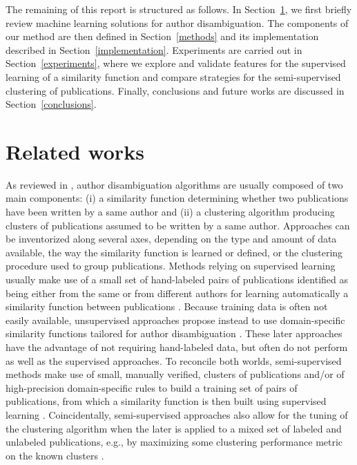 \documentclass{article}
\begin{document}
The remaining of this report is structured as follows. In Section~\ref{related-works},
we first briefly review machine learning solutions for author disambiguation.
The components of our method are then defined in Section~\ref{methods}
and its implementation described in Section~\ref{implementation}. Experiments
are carried out in Section~\ref{experiments}, where we explore and validate
features for the supervised learning of a similarity function and compare
strategies for the semi-supervised clustering of publications.
Finally, conclusions and future works are discussed in Section~\ref{conclusions}.



\section{Related works}
\label{related-works}

As reviewed in
\citep{smalheiser2009author,ferreira2012brief,levin2012citation}, author
disambiguation algorithms are usually composed of two main components: (i) a
similarity function determining whether two publications have been written by a
same author and (ii) a clustering algorithm producing clusters of publications
assumed to be written by a same author. Approaches can be inventorized along
several axes, depending on the type and amount of data available, the way the
similarity function is learned or defined, or the clustering procedure used to
group publications. Methods relying on supervised learning usually make use of
a small set of
hand-labeled pairs of publications identified as being either from the same or
from different authors for learning automatically a similarity function between
publications \citep{han2004two,huang2006efficient,
culotta2007author,treeratpituk2009disambiguating,tran2014author}. Because
training data is often not easily available, unsupervised approaches propose
instead to use domain-specific similarity functions tailored for author
disambiguation \citep{malin2005unsupervised,mcrae2006also,song2007efficient,
soler2007separating, kang2009co,fan2011graph,schulz2014exploiting}. These later
approaches have the advantage of not requiring  hand-labeled data, but often do
not perform as well as the supervised approaches. To reconcile both worlds,
semi-supervised methods make use of small, manually verified, clusters of
publications and/or of high-precision domain-specific rules to build a training
set of pairs of publications, from which a similarity function is then built
using supervised learning
\citep{ferreira2010effective,torvik2009author,levin2012citation}.
Coincidentally, semi-supervised approaches also allow for the tuning of the
clustering algorithm when the later is applied to a mixed set of labeled
and unlabeled publications, e.g., by maximizing some clustering performance
metric on the known clusters \citep{levin2012citation}.
\end{document}
